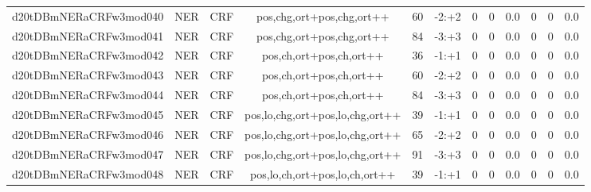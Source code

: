 \documentclass[a4paper]{article}
\begin{document}
\begin{landscape}
\begin{center}
\begin{tabular}{ |c|c|c|c|c|c|c|c|c|c|c|c|}
 
 	
 	\small{ d20tDBmNERaCRFw3mod040 } & \small{ NER} & \small{  CRF }  & pos,chg,ort+pos,chg,ort++  &  60 &  \small{  -2:+2 }  &  0 & 0 & 0.0  &  0 & 0 & 0.0 \\
 	

 
 	
 	\small{ d20tDBmNERaCRFw3mod041 } & \small{ NER} & \small{  CRF }  & pos,chg,ort+pos,chg,ort++  &  84 &  \small{  -3:+3 }  &  0 & 0 & 0.0  &  0 & 0 & 0.0 \\
 	

 
 	
 	\small{ d20tDBmNERaCRFw3mod042 } & \small{ NER} & \small{  CRF }  & pos,ch,ort+pos,ch,ort++  &  36 &  \small{  -1:+1 }  &  0 & 0 & 0.0  &  0 & 0 & 0.0 \\
 	

 
 	
 	\small{ d20tDBmNERaCRFw3mod043 } & \small{ NER} & \small{  CRF }  & pos,ch,ort+pos,ch,ort++  &  60 &  \small{  -2:+2 }  &  0 & 0 & 0.0  &  0 & 0 & 0.0 \\
 	

 
 	
 	\small{ d20tDBmNERaCRFw3mod044 } & \small{ NER} & \small{  CRF }  & pos,ch,ort+pos,ch,ort++  &  84 &  \small{  -3:+3 }  &  0 & 0 & 0.0  &  0 & 0 & 0.0 \\
 	

 
 	
 	\small{ d20tDBmNERaCRFw3mod045 } & \small{ NER} & \small{  CRF }  & pos,lo,chg,ort+pos,lo,chg,ort++  &  39 &  \small{  -1:+1 }  &  0 & 0 & 0.0  &  0 & 0 & 0.0 \\
 	

 
 	
 	\small{ d20tDBmNERaCRFw3mod046 } & \small{ NER} & \small{  CRF }  & pos,lo,chg,ort+pos,lo,chg,ort++  &  65 &  \small{  -2:+2 }  &  0 & 0 & 0.0  &  0 & 0 & 0.0 \\
 	

 
 	
 	\small{ d20tDBmNERaCRFw3mod047 } & \small{ NER} & \small{  CRF }  & pos,lo,chg,ort+pos,lo,chg,ort++  &  91 &  \small{  -3:+3 }  &  0 & 0 & 0.0  &  0 & 0 & 0.0 \\
 	

 
 	
 	\small{ d20tDBmNERaCRFw3mod048 } & \small{ NER} & \small{  CRF }  & pos,lo,ch,ort+pos,lo,ch,ort++  &  39 &  \small{  -1:+1 }  &  0 & 0 & 0.0  &  0 & 0 & 0.0 \\
 	

 
 	

\end{tabular}
\end{center}
\end{landscape}
\end{document}

